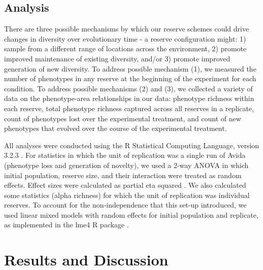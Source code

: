 \documentclass[letterpaper]{article}
\begin{document}
\subsection{Analysis}
	There are three possible mechanisms by which our reserve schemes could drive changes in diversity over evolutionary time - a reserve configuration might: 1) sample from a different range of locations across the environment, 2) promote improved maintenance of existing diversity, and/or 3)  promote improved generation of new diversity. To address possible mechanism (1), we measured the number of phenotypes in any reserve at the beginning of the experiment for each condition. To address possible mechanisms (2) and (3), we collected a variety of data on the phenotype-area relationships in our data: phenotype richness within each reserve, total phenotype richness captured across all reserves in a replicate, count of phenotypes lost over the experimental treatment, and count of new phenotypes that evolved over the course of the experimental treatment.
    
	All analyses were conducted using the R Statistical Computing Language, version 3.2.3 \citep{team_r:_2013}. For statistics in which the unit of replication was a single run of Avida (phenotype loss and generation of novelty), we used a 2-way ANOVA in which initial population, reserve size, and their interaction were treated as random effects. Effect sizes were calculated as partial eta squared \citep{lakens_calculating_2013}. We also calculated some statistics (alpha richness) for which the unit of replication was individual reserves. To account for the non-independence that this set-up introduced, we used linear mixed models with random effects for initial population and replicate, as implemented in the lme4 R package \citep{bates_fitting_2015}.

\section{Results and Discussion}
\end{document}
